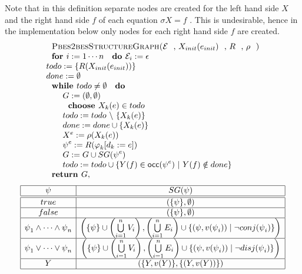 Note that in this definition separate nodes are created for the left hand
side $X$ and the right hand side $f$ of each equation $\sigma X=f$ . This is
undesirable, hence in the implementation below only nodes for each right
hand side $f$ are created.%
\begin{equation*}
\begin{array}{l}
\text{\textsc{Pbes2besStructureGraph(}}\mathcal{E}\text{, }X_{init}(e_{init})%
\text{, }R\text{, }\rho \text{\textsc{)}} \\ 
\text{\textbf{for }}i:=1\cdots n\text{ \textbf{do }}\mathcal{E}%
_{i}:=\epsilon  \\ 
todo:=\{R(X_{init}(e_{init}))\} \\ 
done:=\emptyset  \\ 
\text{\textbf{while }}todo\neq \emptyset \text{ \textbf{do}} \\ 
\qquad G:=(\emptyset ,\emptyset ) \\ 
\qquad \text{\textbf{choose }}X_{k}(e)\in todo \\ 
\qquad todo:=todo\ \backslash \ \{X_{k}(e)\} \\ 
\qquad done:=done\cup \{X_{k}(e)\} \\ 
\qquad X^{e}:=\rho (X_{k}(e)) \\ 
\qquad \psi ^{e}:=R(\varphi _{k}[d_{k}:=e]) \\ 
\qquad G:=G\cup SG(\psi ^{e}) \\ 
\qquad todo:=todo\cup \{Y(f)\in \mathsf{occ}(\psi ^{e})\ |\ Y(f)\notin done\}
\\ 
\text{\textbf{return }}G,%
\end{array}%
\end{equation*}%
\begin{equation*}
\begin{array}{|c|c|}
\hline
\psi  & SG(\psi ) \\ \hline\hline
true & (\{\psi \},\emptyset ) \\ \hline
false & (\{\psi \},\emptyset ) \\ \hline
\psi _{1}\wedge \cdots \wedge \psi _{n} & \left( \{\psi \}\cup \left(
\bigcup\limits_{i=1}^{n}V_{i}\right) ,\left(
\bigcup\limits_{i=1}^{n}E_{i}\right) \cup \{(\psi ,v(\psi _{i}))\mid \lnot
conj(\psi _{i})\}\right)  \\ \hline
\psi _{1}\vee \cdots \vee \psi _{n} & \left( \{\psi \}\cup \left(
\bigcup\limits_{i=1}^{n}V_{i}\right) ,\left(
\bigcup\limits_{i=1}^{n}E_{i}\right) \cup \{(\psi ,v(\psi _{i}))\mid \lnot
disj(\psi _{i})\}\right)  \\ \hline
Y & (\{Y,v(Y)\},\{(Y,v(Y))\}) \\ \hline
\end{array}%
\end{equation*}%
